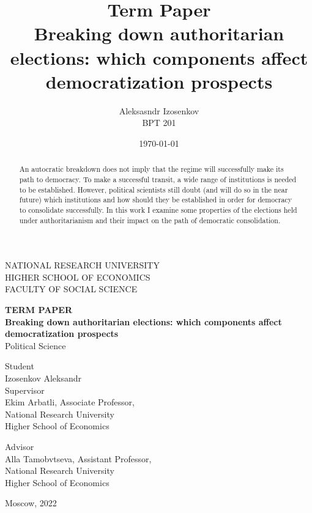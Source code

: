 \documentclass[a4paper, 11pt]{article}
\title{
Term Paper \\  Breaking down authoritarian elections: which components affect democratization prospects}
\author{Aleksasndr Izosenkov \\ BPT 201}
\date{\today}
\begin{document}
\doublespacing

\thispagestyle{empty} 

\begin{center}
NATIONAL RESEARCH UNIVERSITY
\\
HIGHER SCHOOL OF ECONOMICS
\\
FACULTY OF SOCIAL SCIENCE

\end{center}
\vspace{12ex}

\begin{center}
\textbf{TERM PAPER}\\
\vspace{2ex}
\textbf{Breaking down authoritarian elections: which components affect democratization prospects}\\
\vspace{2ex}
Political Science
\end{center}

\vspace{5ex}
\begin{flushright}
\hspace{40ex}
Student\\
Izosenkov Aleksandr \\

\vspace{5ex}
Supervisor\\
Ekim Arbatli, Associate Professor,\\ National Research University \\ Higher School of Economics

\vspace{5ex}
Advisor\\
Alla Tamobvtseva, Assistant Professor, \\National Research University\\ Higher School of Economics


\end{flushright}

\begin{center}
\vfill
Moscow, 2022
\end{center}

\newpage

\begin{abstract}
An autocratic breakdown does not imply that the regime will successfully make its path to democracy. To make a successful transit, a wide range of institutions is needed to be established. However, political scientists still doubt (and will do so in the near future) which institutions and how should they be established in order for democracy to consolidate successfully. In this work I examine some properties of the elections held under authoritarianism and their impact on the path of democratic consolidation. \end{abstract}
\end{document}
